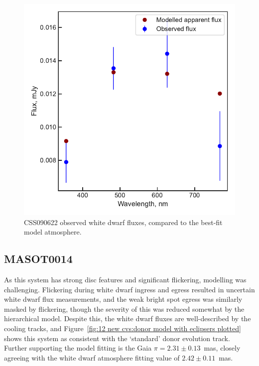 \begin{figure}
    \centering
    \includegraphics[width=\textwidth]{figures/results/CSS090622/fluxplot.pdf}
    \caption{CSS090622 observed white dwarf fluxes, compared to the best-fit model atmosphere.}
    \label{fig:CSS090622 flux plot}
\end{figure}
\clearpage



\newpage
\subsection{MASOT0014}

As this system has strong disc features and significant flickering, modelling was challenging. Flickering during white dwarf ingress and egress resulted in uncertain white dwarf flux measurements, and the weak bright spot egress was similarly masked by flickering, though the severity of this was reduced somewhat by the hierarchical model. Despite this, the white dwarf fluxes are well-described by the cooling tracks, and Figure~\ref{fig:12 new cvs:donor model with eclipsers plotted} shows this system as consistent with the `standard' donor evolution track.
Further supporting the model fitting is the Gaia $\pi = 2.31 \pm 0.13$~mas, closely agreeing with the white dwarf atmosphere fitting value of $2.42\pm0.11$~mas.


